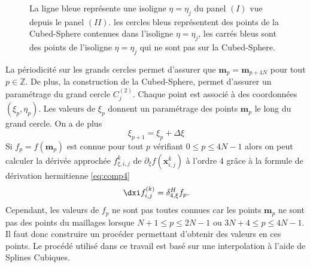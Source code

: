 \begin{figure}[htbp]
\begin{center}
\end{center}
\caption{La ligne bleue représente une isoligne $\eta=\eta_j$ du panel $(I)$ vue depuis le panel $(II)$. les cercles bleus représentent des points de la Cubed-Sphere contenues dans l'isoligne $\eta=\eta_j$, les carrés bleus sont des points de l'isoligne $\eta=\eta_j$ qui ne sont pas sur la Cubed-Sphere.}
\label{fig: panel II_interp}
\end{figure}  

La périodicité sur les grands cercles permet d'assurer que $\mathbf{m}_p = \mathbf{m}_{p+4N}$ pour tout $p \in \mathbb{Z}$. De plus, la construction de la Cubed-Sphere, permet d'assurer un paramétrage du grand cercle $C^{(2)}_j$. Chaque point est associé à des coordonnées $(\xi_p, \eta_p)$. Les valeurs de $\xi_p$ donnent un paramétrage des points $\mathbf{m}_p$ le long du grand cercle. On a de plus
\begin{equation}
\xi_{p+1} = \xi_p + \Delta \xi
\end{equation}
Si $f_p = f(\mathbf{m}_p)$ est connue pour tout $p$ vérifiant $0 \leq p \leq 4N-1$ alors on peut calculer la dérivée approchée $f_{\xi,i,j}^k$ de $\partial_{\xi}f(\mathbf{x}_{i,j}^k)$ à l'ordre $4$ grâce à la formule de dérivation hermitienne \eqref{eq:comp4}
\begin{equation}
\dxi f_{i,j}^{(k)} = \delta_{4,\xi}^H f_p.
\end{equation}
Cependant, les valeurs de $f_p$ ne sont pas toutes connues car les points $\mathbf{m}_p$ ne sont pas des points du maillages lorsque $N+1 \leq p \leq 2N-1$ ou $3N+4 \leq p \leq 4N-1$. Il faut donc construire un procéder permettant d'obtenir des valeurs en ces points. Le procédé utilisé dans ce travail est basé sur une interpolation à l'aide de Splines Cubiques.


